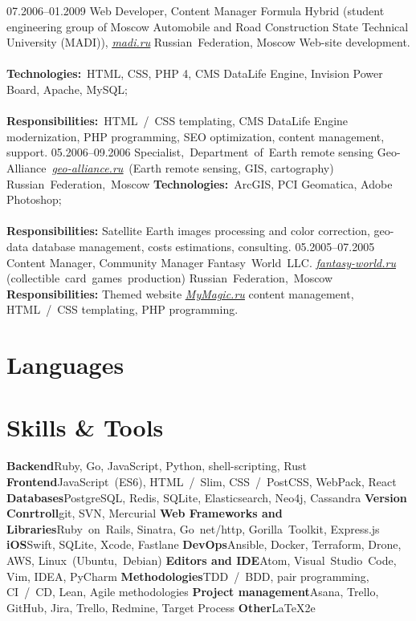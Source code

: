 \documentclass[12pt,a4paper,final]{moderncv}
\begin{document}
\newpage
\cventry
{07.2006--01.2009}
{Web Developer, Content Manager}
{
  Formula Hybrid (student engineering group of Moscow Automobile and Road Construction State Technical University (MADI)), \underline{\href{http://madi.ru}{\itshape madi.ru}}
}
{Russian~Federation, Moscow}
{}
{
  Web-site development.
  \\\\
  \textbf{Technologies:}~HTML, CSS, PHP 4, CMS DataLife Engine, Invision Power Board, Apache, MySQL;
  \\\\
  \textbf{Responsibilities:}~HTML~/~CSS templating, CMS DataLife Engine modernization, PHP programming, SEO optimization, content management, support.
}
%
\cventry
{05.2006--09.2006}
{Specialist,~Department~of~Earth remote sensing}
{Geo-Alliance~\underline{\href{http://geo-alliance.ru}{\itshape geo-alliance.ru}}~(Earth remote sensing, GIS, cartography)}
{Russian~Federation,~Moscow}
{}
{
\textbf{Technologies:}~ArcGIS, PCI Geomatica, Adobe Photoshop;
\\\\
\textbf{Responsibilities:} Satellite Earth images processing and color correction, geo-data database management, costs estimations, consulting.
}
%
\cventry
{05.2005--07.2005}
{Content Manager, Community Manager}
{Fantasy~World~LLC. \underline{\href{http://fantasy-world.ru}{\itshape fantasy-world.ru}} (collectible~card~games~production)}
{Russian~Federation,~Moscow}
{}
{
  \textbf{Responsibilities:} Themed website \underline{\href{http://mymagic.ru}{\itshape MyMagic.ru}} content management, HTML~/~CSS templating, PHP programming.
}

\section{Languages}

\section{Skills \& Tools}
\cvcomputer
{\textbf{Backend}}{Ruby, Go, JavaScript, Python, shell-scripting, Rust}
{\textbf{Frontend}}{JavaScript~(ES6), HTML~/~Slim, CSS~/~PostCSS, WebPack, React}
%
\cvcomputer
{\textbf{Databases}}{PostgreSQL, Redis, SQLite, Elasticsearch, Neo4j, Cassandra}
{\textbf{Version Conrtroll}}{git, SVN, Mercurial}
%
\cvcomputer
{\textbf{Web Frameworks and Libraries}}{Ruby~on~Rails, Sinatra, Go~net/http, Gorilla~Toolkit, Express.js}
{\textbf{iOS}}{Swift, SQLite, Xcode, Fastlane}
%
\cvcomputer
{\textbf{DevOps}}{Ansible, Docker, Terraform, Drone, AWS, Linux~(Ubuntu,~Debian)}
{\textbf{Editors and IDE}}{Atom, Visual~Studio~Code, Vim, IDEA, PyCharm}
%
\cvcomputer
{\textbf{Methodologies}}{TDD~/~BDD, pair programming, CI~/~CD, Lean, Agile methodologies}
{\textbf{Project management}}{Asana, Trello, GitHub, Jira, Trello, Redmine, Target Process}
%
\cvcomputer
{\textbf{Other}}{\LaTeX2e}{}{}
\newpage
\end{document}
